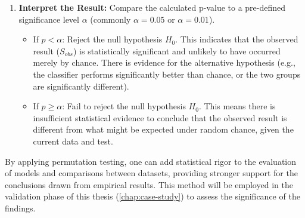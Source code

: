 \begin{enumerate}
  \item \textbf{Interpret the Result:} Compare the calculated p-value to a pre-defined significance level $\alpha$ (commonly $\alpha = 0.05$ or $\alpha = 0.01$).
        \begin{itemize}
          \item If $p < \alpha$: Reject the null hypothesis $H_0$. This indicates that the observed result ($S_{obs}$) is statistically significant and unlikely to have occurred merely by chance. There is evidence for the alternative hypothesis (e.g., the classifier performs significantly better than chance, or the two groups are significantly different).
          \item If $p \ge \alpha$: Fail to reject the null hypothesis $H_0$. This means there is insufficient statistical evidence to conclude that the observed result is different from what might be expected under random chance, given the current data and test.
        \end{itemize}
\end{enumerate}

By applying permutation testing, one can add statistical rigor to the evaluation of models and comparisons between datasets, providing stronger support for the conclusions drawn from empirical results. This method will be employed in the validation phase of this thesis (\autoref{chap:case-study}) to assess the significance of the findings.